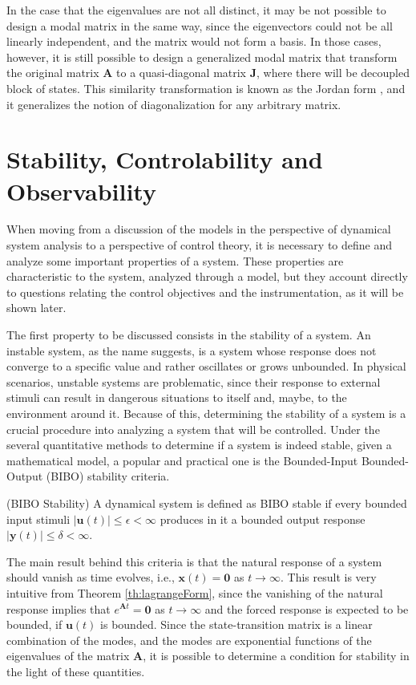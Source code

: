 \documentclass[a4paper,11pt]{book}
\numberwithin{figure}{chapter}
\numberwithin{equation}{chapter}
\numberwithin{table}{chapter}
\theoremstyle{definition}
\newtheorem{definition}{Definition}[chapter]
\newcounter{boxed-theorem}
\newcounter{boxed-definition}
\newenvironment{boxed-definition}[1]
{\begin{shaded} \begin{definition}{#1}}
{\end{definition} \end{shaded}}
\begin{document}
In the case that the eigenvalues are not all distinct, it may be not possible to design a modal matrix in the same way, since the eigenvectors could not be all linearly independent, and the matrix would not form a basis. In those cases, however, it is still possible to design a generalized modal matrix that transform the original matrix $\bm{A}$ to a quasi-diagonal matrix $\bm{J}$, where there will be decoupled block of states. This similarity transformation is known as the Jordan form \cite{Strang:2016}, and it generalizes the notion of diagonalization for any arbitrary matrix.

\section{Stability, Controlability and Observability}

When moving from a discussion of the models in the perspective of dynamical system analysis to a perspective of control theory, it is necessary to define and analyze some important properties of a system. These properties are characteristic to the system, analyzed through a model, but they account directly to questions relating the control objectives and the instrumentation, as it will be shown later.

The first property to be discussed consists in the stability of a system. An instable system, as the name suggests, is a system whose response does not converge to a specific value and rather oscillates or grows unbounded. In physical scenarios, unstable systems are problematic, since their response to external stimuli can result in dangerous situations to itself and, maybe, to the environment around it. Because of this, determining the stability of a system is a crucial procedure into analyzing a system that will be controlled. Under the several quantitative methods to determine if a system is indeed stable, given a mathematical model, a popular and practical one is the Bounded-Input Bounded-Output (BIBO) stability criteria.

\begin{boxed-definition}{(BIBO Stability)} \label{def:BIBOStab}
    A dynamical system is defined as BIBO stable if every bounded input stimuli $| \bm{u}(t) | \leq \epsilon < \infty$ produces in it a bounded output response $| \bm{y}(t) | \leq \delta < \infty$.
\end{boxed-definition}

The main result behind this criteria is that the natural response of a system should vanish as time evolves, i.e., $\bm{x}(t) = \bm{0}$ as $t \to \infty$. This result is very intuitive from Theorem \ref{th:lagrangeForm}, since the vanishing of the natural response implies that $e^{\bm{A} t} = \bm{0}$ as $t \to \infty$ and the forced response is expected to be bounded, if $\bm{u}(t)$ is bounded. Since the state-transition matrix is a linear combination of the modes, and the modes are exponential functions of the eigenvalues of the matrix $\bm{A}$, it is possible to determine a condition for stability in the light of these quantities.
\end{document}
